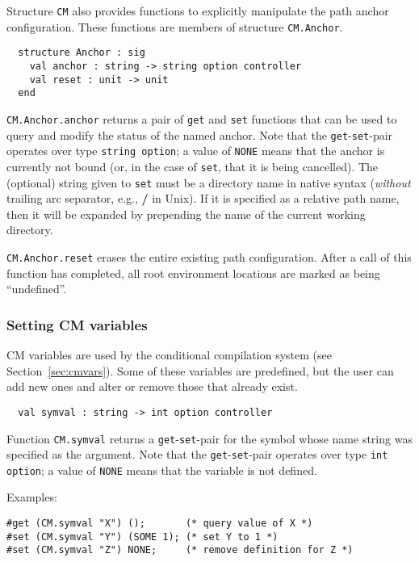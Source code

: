 \documentclass[titlepage,letterpaper]{article}
\begin{document}
Structure {\tt CM} also provides functions to explicitly manipulate
the path anchor configuration.  These functions are members of
structure {\tt CM.Anchor}.

\begin{verbatim}
  structure Anchor : sig
    val anchor : string -> string option controller
    val reset : unit -> unit
  end
\end{verbatim}

{\tt CM.Anchor.anchor} returns a pair of {\tt get} and {\tt set}
functions that can be used to query and modify the status of the named
anchor.  Note that the {\tt get}-{\tt set}-pair operates over type
{\tt string option}; a value of {\tt NONE} means that the anchor is
currently not bound (or, in the case of {\tt set}, that it is being
cancelled).  The (optional) string given to {\tt set} must be a
directory name in native syntax ({\em without} trailing arc separator,
e.g., {\bf /} in Unix).  If it is specified as a relative path name,
then it will be expanded by prepending the name of the current working
directory.

{\tt CM.Anchor.reset} erases the entire existing path configuration.
After a call of this function has completed, all root environment
locations are marked as being ``undefined''.

\subsubsection*{Setting CM variables}

CM variables are used by the conditional compilation system (see
Section~\ref{sec:cmvars}).  Some of these variables are predefined,
but the user can add new ones and alter or remove those that already
exist.

\begin{verbatim}
  val symval : string -> int option controller
\end{verbatim}

Function {\tt CM.symval} returns a {\tt get}-{\tt set}-pair for the
symbol whose name string was specified as the argument.  Note that the
{\tt get}-{\tt set}-pair operates over type {\tt int option}; a value
of {\tt NONE} means that the variable is not defined.

\noindent Examples:
\begin{verbatim}
#get (CM.symval "X") ();       (* query value of X *)
#set (CM.symval "Y") (SOME 1); (* set Y to 1 *)
#set (CM.symval "Z") NONE;     (* remove definition for Z *)
\end{verbatim}
\end{document}
